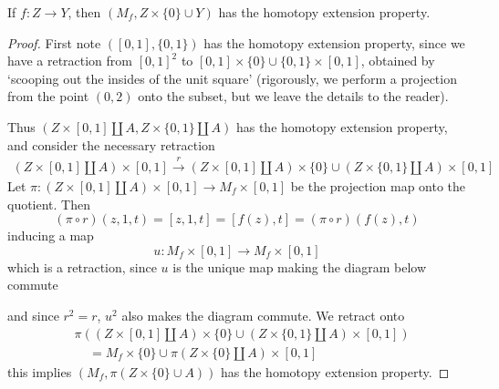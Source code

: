 \begin{lemma}
    If $f:Z \to Y$, then $(M_f, Z \times \{ 0 \} \cup Y)$ has the homotopy extension property.
\end{lemma}
\begin{proof}
        First note $([0,1], \{ 0, 1 \})$ has the homotopy extension property, since we have a retraction from $[0,1]^2$ to $[0,1] \times \{ 0 \} \cup \{ 0,1 \} \times [0,1]$, obtained by `scooping out the insides of the unit square' (rigorously, we perform a projection from the point $(0,2)$ onto the subset, but we leave the details to the reader).

    Thus $(Z \times [0,1] \coprod A, Z \times \{ 0, 1 \} \coprod A)$ has the homotopy extension property, and consider the necessary retraction
    \begin{align*}
        (Z \times [0,1] \coprod A) \times [0,1] \xrightarrow{r} (Z \times [0,1] \coprod A) \times \{ 0 \} \cup (Z \times \{ 0, 1 \} \coprod A) \times [0,1]
    \end{align*}
    Let $\pi: (Z \times [0,1] \coprod A) \times [0,1] \to M_f \times [0,1]$ be the projection map onto the quotient. Then
    \[ (\pi \circ r)(z,1,t) = [z,1,t] = [f(z),t] = (\pi \circ r)(f(z),t) \]
    inducing a map
    \[ u: M_f \times [0,1] \to M_f \times [0,1] \]
    which is a retraction, since $u$ is the unique map making the diagram below commute
    \begin{center}
    \end{center}
    and since $r^2 = r$, $u^2$ also makes the diagram commute. We retract onto
    \begin{align*}
        &\pi((Z \times [0,1] \coprod A) \times \{ 0 \} \cup (Z \times \{ 0, 1 \} \coprod A) \times [0,1])\\
        &\ \ \ \ \ = M_f \times \{ 0 \} \cup \pi(Z \times \{ 0 \} \coprod A) \times [0,1]
    \end{align*}
    this implies $(M_f, \pi(Z \times \{ 0 \} \cup A))$ has the homotopy extension property.
\end{proof}

